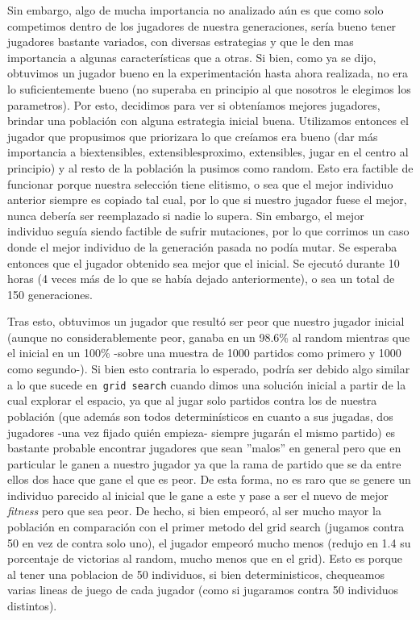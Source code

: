 \documentclass[A4paper,oneside,fleqn,11pt]{article}
\theoremstyle{definition}
\begin{document}
Sin embargo, algo de mucha importancia no analizado aún es que como solo competimos dentro de los jugadores de nuestra generaciones, sería bueno tener jugadores bastante variados, con diversas estrategias y que le den mas importancia a algunas características que a otras. Si bien, como ya se dijo, obtuvimos un jugador bueno en la experimentación hasta ahora realizada, no era lo suficientemente bueno (no superaba en principio al que nosotros le elegimos los parametros). Por esto, decidimos para ver si obteníamos mejores jugadores, brindar una población con alguna estrategia inicial buena. Utilizamos entonces el jugador que propusimos que priorizara lo que creíamos era bueno (dar más importancia a biextensibles, extensiblesproximo, extensibles, jugar en el centro al principio) y al resto de la población la pusimos como random. Esto era factible de funcionar porque nuestra selección tiene elitismo, o sea que el mejor individuo anterior siempre es copiado tal cual, por lo que si nuestro jugador fuese el mejor, nunca debería ser reemplazado si nadie lo supera. Sin embargo, el mejor individuo seguía siendo factible de sufrir mutaciones, por lo que corrimos un caso donde el mejor individuo de la generación pasada no podía mutar. Se esperaba entonces que el jugador obtenido sea mejor que el inicial. Se ejecutó durante 10 horas (4 veces más de lo que se había dejado anteriormente), o sea un total de 150 generaciones. 

Tras esto, obtuvimos un jugador que resultó ser peor que nuestro jugador inicial (aunque no considerablemente peor, ganaba en un 98.6\% al random mientras que el inicial en un 100\% -sobre una muestra de 1000 partidos como primero y 1000 como segundo-). Si bien esto contraria lo esperado, podría ser debido algo similar a lo que sucede en\texttt{ grid search} cuando dimos una solución inicial a partir de la cual explorar el espacio, ya que al jugar solo partidos contra los de nuestra población (que además son todos determinísticos en cuanto a sus jugadas, dos jugadores -una vez fijado quién empieza- siempre jugarán el mismo partido) es bastante probable encontrar jugadores que sean ''malos'' en general pero que en particular le ganen a nuestro jugador ya que la rama de partido que se da entre ellos dos hace que gane el que es peor. De esta forma, no es raro que se genere un individuo parecido al inicial que le gane a este y pase a ser el nuevo de mejor \textit{fitness} pero que sea peor. De hecho, si bien empeoró, al ser mucho mayor la población en comparación con el primer metodo del grid search (jugamos contra 50 en vez de contra solo uno), el jugador empeoró mucho menos (redujo en 1.4 su porcentaje de victorias al random, mucho menos que en el grid). Esto es porque al tener una poblacion de 50 individuos, si bien deterministicos, chequeamos varias lineas de juego de cada jugador (como si jugaramos contra 50 individuos distintos).
\end{document}
